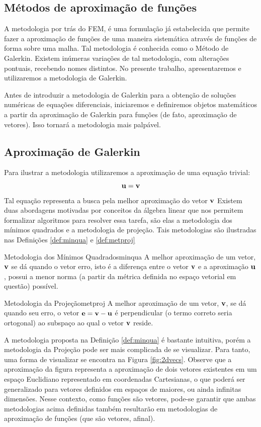	\subsection{Métodos de aproximação de funções}
	A metodologia por trás do FEM, é uma formulação já estabelecida que permite
  fazer a aproximação de funções de uma maneira sistemática através de funções
  de forma sobre uma malha. Tal metodologia é conhecida como o Método de Galerkin. Existem
  inúmeras variações de tal metodologia, com alterações pontuais, recebendo
  nomes distintos. No presente trabalho, apresentaremos e utilizaremos a
  metodologia de Galerkin.

  Antes de introduzir a metodologia de Galerkin para a obtenção de soluções
  numéricas de equações diferenciais, iniciaremos e definiremos objetos
  matemáticos a partir da aproximação de Galerkin para funções (de fato,
  aproximação de vetores). Isso tornará a metodologia mais palpável.

  \subsection{Aproximação de Galerkin}
  Para ilustrar a metodologia utilizaremos a aproximação de uma equação
  trivial: 
  \begin{equation}
  \bm{\mathrm{u}} = \bm{\mathrm{v}}
  \end{equation}
  Tal equação representa a busca pela melhor aproximação do vetor $\bm{\mathrm{v}}$ 
  Existem duas abordagens motivadas por conceitos da álgebra
  linear que nos permitem formalizar algoritmos para resolver essa tarefa, são
  elas a metodologia dos mínimos quadrados e a metodologia de projeção. Tais
  metodologias são ilustradas nas Definições \ref{def:minqua} e \ref{def:metproj} 

  \begin{Definition}{Metodologia dos Mínimos Quadrados}{minqua}
  A melhor aproximação de um vetor, $\bm{\mathrm{v}}$ se dá quando o vetor erro, isto é a
  diferença entre o vetor $\bm{\mathrm{v}}$ e a aproximação $\bm{\mathrm{u}}$, possui a menor norma
  (a partir da métrica definida no espaço vetorial em questão) possível.
  \end{Definition}

  \begin{Definition}{Metodologia da Projeção}{metproj}
  A melhor aproximação de um vetor, $\bm{\mathrm{v}}$, se dá quando seu erro, o vetor $\bm{\mathrm{e}} =
  \bm{\mathrm{v}} - \bm{\mathrm{u}}$ é perpendicular (o termo correto seria ortogonal) ao
  subspaço ao qual o vetor $\bm{\mathrm{v}}$ reside.
  \end{Definition}
  A metodologia proposta na Definição \ref{def:minqua} é bastante intuitiva,
  porém a metodologia da Projeção pode ser mais complicada de se visualizar.
  Para tanto, uma forma de visualizar se encontra na Figura \ref{fig:2dvecs}.
  Observe que a aproximação da figura representa a aproximação de dois vetores
  existentes em um espaço Euclidiano representado em coordenadas Cartesianas, o
  que poderá ser generalizado para vetores definidos em espaços de maiores, ou
  ainda infinitas dimensões. Nesse contexto, como funções são vetores, pode-se
  garantir que ambas metodologias acima definidas também resultarão em
  metodologias de aproximação de funções (que são vetores, afinal).

